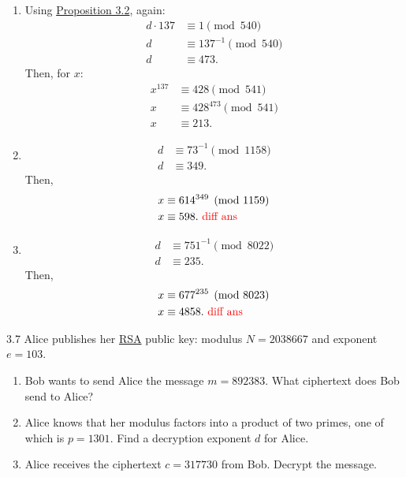 {\begin{enumerate}
        \item Using \hyperlink{3.2}{Proposition 3.2}, again:
              \begin{align*}
                  d \cdot 137 & \equiv 1 \pmod{540}        \\
                  d           & \equiv 137^{-1} \pmod{540} \\
                  d           & \equiv 473.
              \end{align*} Then, for \(x\):
              \begin{align*}
                  x^{137} & \equiv 428 \pmod{541}       \\
                  x       & \equiv 428^{473} \pmod{541} \\
                  x       & \equiv 213.
              \end{align*}
        \item \begin{align*}
                  d & \equiv 73^{-1} \pmod{1158} \\
                  d & \equiv 349.
              \end{align*} Then,
              \begin{align*}
                  x & \equiv 614^{349} \pmod{1159} \\
                  x & \equiv 598. \text{ \textcolor{red}{diff ans}}
              \end{align*}
        \item \begin{align*}
                  d & \equiv 751^{-1} \pmod{8022} \\
                  d & \equiv 235.
              \end{align*} Then, \begin{align*}
                  x & \equiv 677^{235} \pmod{8023} \\
                  x & \equiv 4858. \text{ \textcolor{red}{diff ans}}
              \end{align*}
    \end{enumerate}
}

\begin{exercise}
    {3.7} {Alice publishes her \hyperlink{sec:RSA Algorithm}{RSA} public key: modulus \(N = 2038667\) and exponent \(e = 103\).}
    \begin{enumerate}
        \item Bob wants to send Alice the message \(m = 892383\). What ciphertext does Bob send to Alice?
        \item Alice knows that her modulus factors into a product of two primes, one of which is \(p = 1301\). Find a decryption exponent \(d\) for Alice.
        \item Alice receives the ciphertext \(c = 317730\) from Bob. Decrypt the message.
    \end{enumerate}
\end{exercise}

